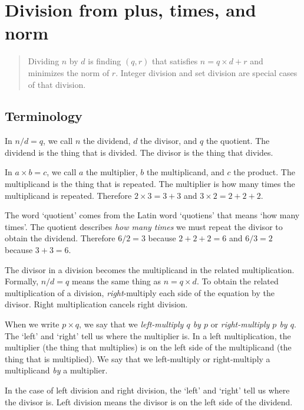 \chapter{Division from plus, times, and norm}

\begin{abstract}
    Dividing \(n\) by \(d\) is finding
    \((q,r)\) that satisfies \(n = q \times d + r\)
    and minimizes the norm of \(r\).
    Integer division and set division are special cases of that division.
\end{abstract}

\section{Terminology}

In \(n / d = q\),
we call \(n\) the dividend,
\(d\) the divisor,
and \(q\) the quotient.
The dividend is the thing that is divided.
The divisor is the thing that divides.

In \(a \times b = c\),
we call \(a\) the multiplier, \(b\) the multiplicand, and \(c\) the product.
The multiplicand is the thing that is repeated.
The multiplier is how many times the multiplicand is repeated.
Therefore \(2 \times 3 = 3+3\) and \(3 \times 2 = 2+2+2\).

The word `quotient' comes from the Latin word `quotiens' that means `how many times'.
The quotient describes \emph{how many times} we must repeat the divisor to obtain the dividend.
Therefore \(6/2 = 3\) because \(2+2+2 = 6\)
and \(6/3 = 2\) because \(3+3 = 6\).

The divisor in a division
becomes the multiplicand in the related multiplication.
Formally, \(n / d = q\) means the same thing as \(n = q \times d\).
To obtain the related multiplication of a division,
\emph{right}-multiply each side of the equation by the divisor.
Right multiplication cancels right division.

When we write \(p \times q\), we say that we \emph{left-multiply \(q\) by \(p\)}
or \emph{right-multiply \(p\) by \(q\)}.
The `left' and `right' tell us where the multiplier is.
In a left multiplication, the multiplier (the thing that multiplies)
is on the left side of the multiplicand (the thing that is multiplied).
We say that we left-multiply or right-multiply a multiplicand \emph{by} a multiplier.

In the case of left division and right division,
the `left' and `right' tell us where the divisor is.
Left division means the divisor is on the left side of the dividend.

